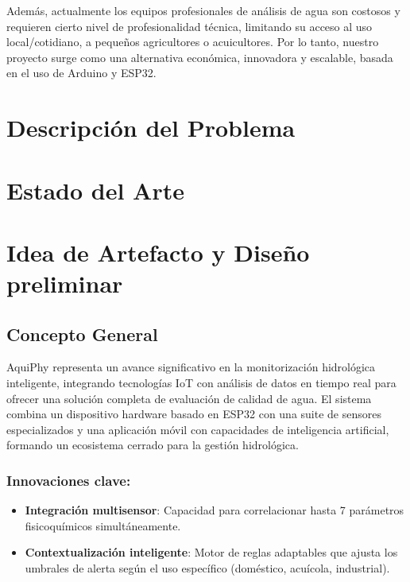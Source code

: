 \documentclass{article}
\begin{document}
Además, actualmente los equipos profesionales de análisis de agua son costosos y requieren cierto nivel de profesionalidad técnica, limitando su acceso al uso local/cotidiano, a pequeños agricultores o acuicultores. Por lo tanto, nuestro proyecto surge como una alternativa económica, innovadora y escalable, basada en el uso de Arduino y ESP32.

\section{Descripción del Problema}

\section{Estado del Arte}

\section{Idea de Artefacto y Diseño preliminar}

\subsection{Concepto General}
AquiPhy representa un avance significativo en la monitorización hidrológica inteligente, integrando tecnologías IoT con análisis de datos en tiempo real para ofrecer una solución completa de evaluación de calidad de agua. El sistema combina un dispositivo hardware basado en ESP32 con una suite de sensores especializados y una aplicación móvil con capacidades de inteligencia artificial, formando un ecosistema cerrado para la gestión hidrológica.

\subsubsection{Innovaciones clave:}

\begin{itemize}
    \item \textbf{Integración multisensor}: Capacidad para correlacionar hasta 7 parámetros fisicoquímicos simultáneamente.
    \item \textbf{Contextualización inteligente}: Motor de reglas adaptables que ajusta los umbrales de alerta según el uso específico (doméstico, acuícola, industrial).
\end{itemize}
\end{document}
